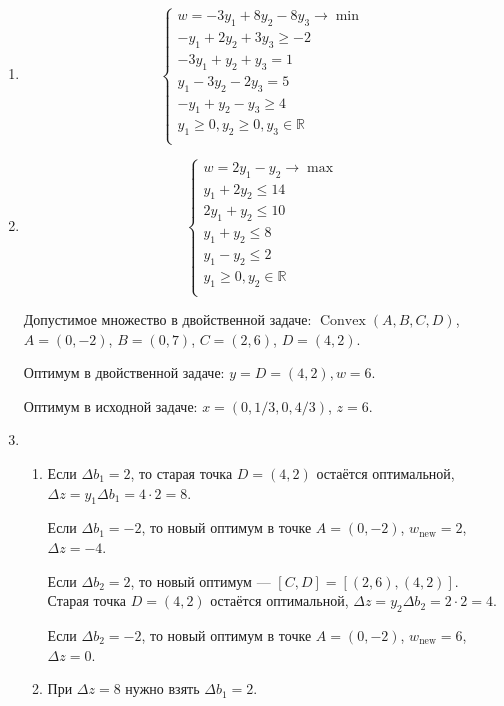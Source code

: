 \documentclass[12pt]{article}
\newcommand \RR{\mathbb{R}}
\DeclareMathOperator{\Convex}{Convex}
\begin{document}
\begin{enumerate}
  \item 
  \[
    \begin{cases}
      w = -3y_1 +8 y_2 - 8 y_3 \to \min \\
      -y_1 + 2y_2 +3y_3\geq -2  \\
      -3y_1 + y_2 + y_3= 1 \\
      y_1 -3 y_2 -2y_3= 5 \\
      -y_1 + y_2 - y_3\geq 4 \\
      y_1 \geq 0, y_2 \geq 0, y_3 \in \RR \\
    \end{cases}  
  \]
  \item 
\[
\begin{cases}
  w = 2y_1 - y_2 \to \max \\
  y_1 + 2y_2 \leq 14  \\
  2y_1 + y_2 \leq 10 \\
  y_1 + y_2 \leq 8 \\
  y_1 - y_2 \leq 2 \\
  y_1 \geq 0, y_2 \in \RR \\
\end{cases}  
\]


Допустимое множество в двойственной задаче: $\Convex(A, B, C, D)$, $A = (0, -2)$, $B = (0, 7)$, $C = (2, 6)$, $D = (4, 2)$.

Оптимум в двойственной задаче: $y = D = (4, 2), w = 6$.

Оптимум в исходной задаче: $x = (0, 1/3, 0, 4/3)$, $z= 6$.

\item %

\begin{enumerate}
  \item Если $\Delta b_1 = 2$, то старая точка $D = (4, 2)$ остаётся оптимальной, $\Delta z = y_1 \Delta b_1 = 4 \cdot 2 = 8$.

Если $\Delta b_1 = -2$, то новый оптимум в точке $A = (0, -2)$, $w_{\text{new}} = 2$, $\Delta z = -4$.

Если $\Delta b_2 = 2$, то новый оптимум — $[C, D] = [(2, 6), (4, 2)]$. 
Старая точка $D = (4, 2)$ остаётся оптимальной, $\Delta z = y_2 \Delta b_2 = 2 \cdot 2 = 4$.

Если $\Delta b_2 = -2$, то новый оптимум в точке $A = (0, -2)$, $w_{\text{new}} = 6$, $\Delta z = 0$.

\item При $\Delta z = 8$ нужно взять $\Delta b_1 = 2$.


\end{enumerate}
\end{enumerate}
\end{document}
